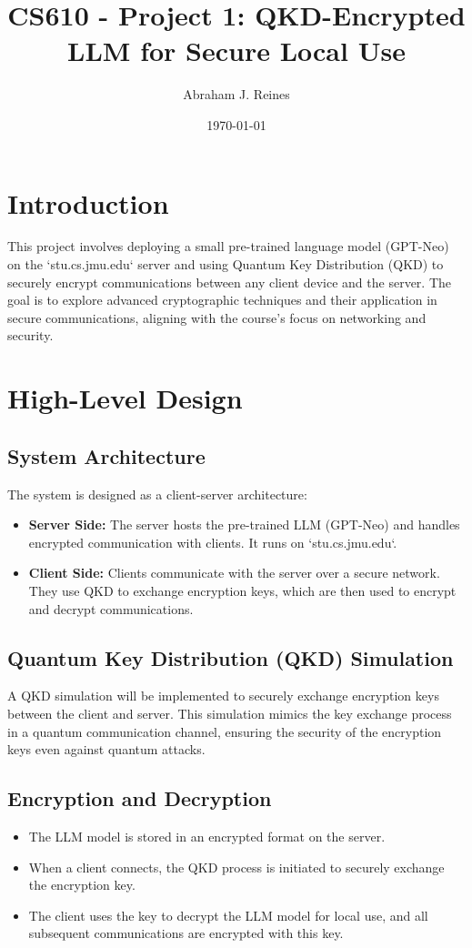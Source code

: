 \documentclass{article}
\title{CS610 - Project 1: QKD-Encrypted LLM for Secure Local Use}
\author{Abraham J. Reines}
\date{\today}
\begin{document}
\maketitle

\tableofcontents

\section{Introduction}
This project involves deploying a small pre-trained language model (GPT-Neo) on the `stu.cs.jmu.edu` server and using Quantum Key Distribution (QKD) to securely encrypt communications between any client device and the server. The goal is to explore advanced cryptographic techniques and their application in secure communications, aligning with the course's focus on networking and security.

\section{High-Level Design}

\subsection{System Architecture}
The system is designed as a client-server architecture:
\begin{itemize}
    \item \textbf{Server Side:} The server hosts the pre-trained LLM (GPT-Neo) and handles encrypted communication with clients. It runs on `stu.cs.jmu.edu`.
    \item \textbf{Client Side:} Clients communicate with the server over a secure network. They use QKD to exchange encryption keys, which are then used to encrypt and decrypt communications.
\end{itemize}

\subsection{Quantum Key Distribution (QKD) Simulation}
A QKD simulation will be implemented to securely exchange encryption keys between the client and server. This simulation mimics the key exchange process in a quantum communication channel, ensuring the security of the encryption keys even against quantum attacks.

\subsection{Encryption and Decryption}
\begin{itemize}
    \item The LLM model is stored in an encrypted format on the server. 
    \item When a client connects, the QKD process is initiated to securely exchange the encryption key.
    \item The client uses the key to decrypt the LLM model for local use, and all subsequent communications are encrypted with this key.
\end{itemize}
\end{document}
